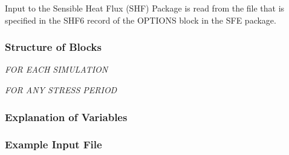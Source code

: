 Input to the Sensible Heat Flux (SHF) Package is read from the file that is specified in the SHF6 record of the OPTIONS block in the SFE package.

\vspace{5mm}
\subsubsection{Structure of Blocks}
\vspace{5mm}

\noindent \textit{FOR EACH SIMULATION}

\vspace{5mm}
\noindent \textit{FOR ANY STRESS PERIOD}


\vspace{5mm}
\subsubsection{Explanation of Variables}
\begin{description}

\end{description}

\vspace{5mm}
\subsubsection{Example Input File}

